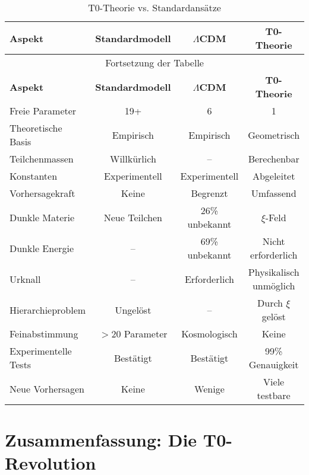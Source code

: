 \documentclass[12pt,a4paper]{article}
\begin{document}
	\begin{center}
		\begin{longtable}{lccc}
			\caption{T0-Theorie vs. Standardansätze} \\
			\toprule
			\textbf{Aspekt} & \textbf{Standardmodell} & \textbf{$\Lambda$CDM} & \textbf{T0-Theorie} \\
			\midrule
			\endfirsthead
			\multicolumn{4}{c}{Fortsetzung der Tabelle} \\
			\toprule
			\textbf{Aspekt} & \textbf{Standardmodell} & \textbf{$\Lambda$CDM} & \textbf{T0-Theorie} \\
			\midrule
			\endhead
			\bottomrule
			\endlastfoot
			
			Freie Parameter & 19+ & 6 & 1 \\
			Theoretische Basis & Empirisch & Empirisch & Geometrisch \\
			Teilchenmassen & Willkürlich & -- & Berechenbar \\
			Konstanten & Experimentell & Experimentell & Abgeleitet \\
			Vorhersagekraft & Keine & Begrenzt & Umfassend \\
			Dunkle Materie & Neue Teilchen & 26\% unbekannt & $\xi$-Feld \\
			Dunkle Energie & -- & 69\% unbekannt & Nicht erforderlich \\
			Urknall & -- & Erforderlich & Physikalisch unmöglich \\
			Hierarchieproblem & Ungelöst & -- & Durch $\xi$ gelöst \\
			Feinabstimmung & $>$20 Parameter & Kosmologisch & Keine \\
			Experimentelle Tests & Bestätigt & Bestätigt & 99\% Genauigkeit \\
			Neue Vorhersagen & Keine & Wenige & Viele testbare \\
		\end{longtable}
	\end{center}
	
	\section{Zusammenfassung: Die T0-Revolution}
	
\end{document}
